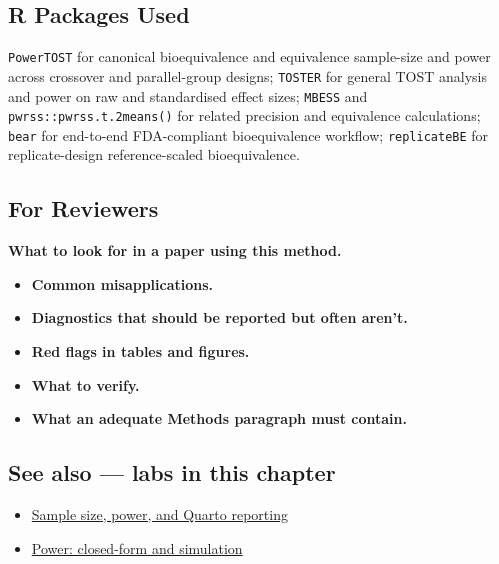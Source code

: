 \documentclass[
]{article}
\providecommand{\tightlist}{%
  \setlength{\itemsep}{0pt}\setlength{\parskip}{0pt}}
\begin{document}
\subsection{R Packages Used}\label{r-packages-used}

\texttt{PowerTOST} for canonical bioequivalence and equivalence
sample-size and power across crossover and parallel-group designs;
\texttt{TOSTER} for general TOST analysis and power on raw and
standardised effect sizes; \texttt{MBESS} and
\texttt{pwrss::pwrss.t.2means()} for related precision and equivalence
calculations; \texttt{bear} for end-to-end FDA-compliant bioequivalence
workflow; \texttt{replicateBE} for replicate-design reference-scaled
bioequivalence.

\subsection{For Reviewers}\label{for-reviewers}

\textbf{What to look for in a paper using this method.}

\begin{itemize}
\tightlist
\item
  \textbf{Common misapplications.}
\item
  \textbf{Diagnostics that should be reported but often aren't.}
\item
  \textbf{Red flags in tables and figures.}
\item
  \textbf{What to verify.}
\item
  \textbf{What an adequate Methods paragraph must contain.}
\end{itemize}

\subsection{See also --- labs in this
chapter}\label{see-also-labs-in-this-chapter}

\begin{itemize}
\tightlist
\item
  \href{labs/lab-sample-size-power-and-quarto-reporting.Rmd}{Sample
  size, power, and Quarto reporting}
\item
  \href{labs/lab-power-closed-form-and-simulation.Rmd}{Power:
  closed-form and simulation}
\end{itemize}
\end{document}
